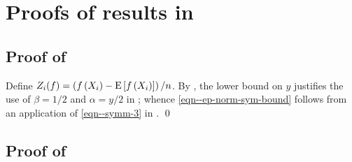
\section{Proofs of results in
\texorpdfstring{}{Section
\ref{sec--prob-ineq-prelim}}}

\subsection{Proof of \texorpdfstring{%
}{Lemma \ref{lem--ep-norm-sym-bound}}}
\label{sec--prf--lem--ep-norm-sym-bound}

Define \(Z_{i} (f) = \left( f \left( X_{i} \right) - \mathrm{E} \left[ f
\left( X_{i} \right) \right] \right) / n\).
By , the lower bound on \(y\) justifies the use of
\(\beta = 1 / 2\) and \(\alpha = y / 2\) in ; whence
\eqref{eqn--ep-norm-sym-bound} follows from an application of
\eqref{eqn--symm-3} in .
\qed

\subsection{Proof of \texorpdfstring{%
}{Lemma
\ref{lem--ep-sym-unif-hoeffding-cond}}}
\label{sec--prf--lem--ep-sym-unif-hoeffding-cond}

